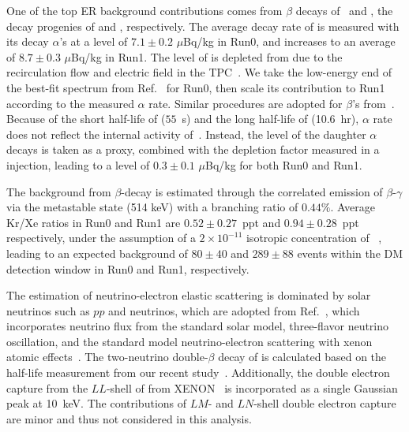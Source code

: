 \documentclass[%
 reprint,
superscriptaddress,
 amsmath,amssymb,
 aps,
 prl,
]{revtex4-1}
\begin{document}
One of the top ER background contributions comes from $\beta$ decays of \, and , the decay progenies of  and , respectively.  
The average decay rate of  is measured with its decay $\alpha$'s at a level of $7.1 \pm 0.2$ $\mu$Bq/kg in Run0, and increases to an average of $8.7 \pm 0.3$ $\mu$Bq/kg in Run1.
The level of  is depleted from  due to the recirculation flow and electric field in the TPC~\cite{Ma2020_RnDepletion}.
We take the low-energy end of the best-fit  spectrum from Ref.~\cite{Yan2024_Xe134DBD} for Run0, then scale its contribution to Run1 according to the measured  $\alpha$ rate.
Similar procedures are adopted for $\beta$'s from \,.
Because of the short half-life of  ($55$~s) and the long half-life of  (10.6~hr),  $\alpha$ rate does not reflect the internal activity of \,.
Instead, the level of the daughter  $\alpha$ decays is taken as a proxy, combined with the depletion factor measured in a  injection, leading to a  level of $0.3 \pm 0.1$ $\mu$Bq/kg for both Run0 and Run1.

The background from  $\beta$-decay is estimated through the correlated emission of $\beta$-$\gamma$ via the metastable state  (514 keV) with a branching ratio of $0.44\%$. 
Average Kr/Xe ratios in Run0 and Run1 are $0.52 \pm 0.27$~ppt and $0.94 \pm 0.28$~ppt respectively, under the assumption of a $2\times10^{-11}$ isotropic concentration of ~\cite{Collon2004_forKr}, leading to an expected background of $80 \pm 40$ and $289 \pm 88$ events within the DM detection window in Run0 and Run1, respectively.

The estimation of neutrino-electron elastic scattering is dominated by solar neutrinos such as $pp$ and  neutrinos, which are adopted from Ref.~\cite{Lu2024_P4Solarpp}, which incorporates neutrino flux from the standard solar model, three-flavor neutrino oscillation, and the standard model neutrino-electron scattering with xenon atomic effects~\cite{Chen2017_AtomicEffectSolarNu}.
The two-neutrino double-$\beta$ decay of  is calculated based on the half-life measurement from our recent study~\cite{Si2022_Xe136DBD}. Additionally, the double electron capture from the $LL$-shell of  from XENON~\cite{Aprile2022_Xe124136} is incorporated as a single Gaussian peak at 10~keV. The contributions of $LM$- and $LN$-shell double electron capture are minor and thus not considered in this analysis.
\end{document}
